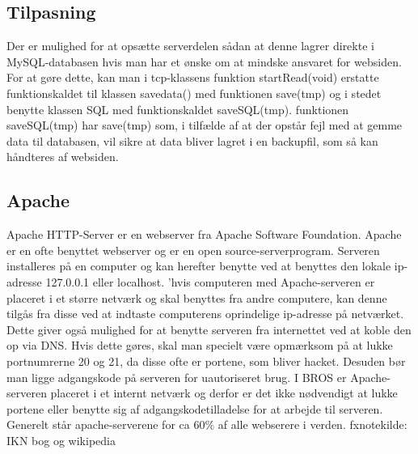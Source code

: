 \subsection{Tilpasning}
Der er mulighed for at opsætte serverdelen sådan at denne lagrer direkte i MySQL-databasen hvis man har et ønske om at mindske ansvaret for websiden. For at gøre dette, kan man i tcp-klassens funktion startRead(void) erstatte funktionskaldet til klassen savedata() med funktionen save(tmp) og i stedet benytte klassen SQL med funktionskaldet saveSQL(tmp). funktionen saveSQL(tmp) har save(tmp) som, i tilfælde af at der opstår fejl med at gemme data til databasen, vil sikre at data bliver lagret i en backupfil, som så kan håndteres af websiden.

\subsection{Apache}
Apache HTTP-Server er en webserver fra Apache Software Foundation. Apache er en ofte benyttet webserver og er en open source-serverprogram. Serveren installeres på en computer og kan herefter benytte ved at benyttes den lokale ip-adresse 127.0.0.1 eller localhost. 'hvis computeren med Apache-serveren er placeret i et større netværk og skal benyttes fra andre computere, kan denne tilgås fra disse ved at indtaste computerens oprindelige ip-adresse på netværket. Dette giver også mulighed for at benytte serveren fra internettet ved at koble den op via DNS. Hvis dette gøres, skal man specielt være opmærksom på at lukke portnumrerne 20 og 21, da disse ofte er portene, som bliver hacket. Desuden bør man ligge adgangskode på serveren for uautoriseret brug. I BROS er Apache-serveren placeret i et internt netværk og derfor er det ikke nødvendigt at lukke portene eller benytte sig af adgangskodetilladelse for at arbejde til serveren.
Generelt står apache-serverene for ca 60\% af alle webserere i verden.
fxnote{kilde: IKN bog og wikipedia} 


